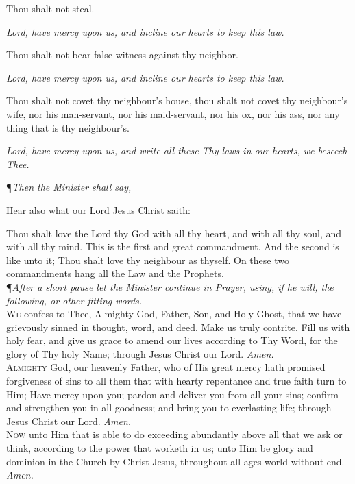 Thou shalt not steal.

\textit{Lord, have mercy upon us, and incline our hearts to keep this law.}

Thou shalt not bear false witness against thy neighbor.

\textit{Lord, have mercy upon us, and incline our hearts to keep this law.}

Thou shalt not covet thy neighbour's house, thou shalt not covet thy neighbour's wife, nor his man-servant, nor his maid-servant, nor his ox, nor his ass, nor any thing that is thy neighbour's.

\textit{Lord, have mercy upon us, and write all these Thy laws in our hearts, we beseech Thee.} \\

{\centering \P\textit{Then the Minister shall say,} \par}
\vspace{2ex}

Hear also what our Lord Jesus Christ saith: \par
Thou shalt love the Lord thy God with all thy heart, and with all thy soul, and with all thy mind.
This is the first and great commandment.
And the second is like unto it; Thou shalt love thy neighbour as thyself.
On these two commandments hang all the Law and the Prophets. \\

\noindent\P\textit{After a short pause let the Minister continue in Prayer, using, if he will, the following, or other fitting words.} \\

\noindent\lettrine{W}{e} confess to Thee, Almighty God, Father, Son, and Holy Ghost, that we have grievously sinned in thought, word, and deed.
Make us truly contrite.
Fill us with holy fear, and give us grace to amend our lives according to Thy Word, for the glory of Thy holy Name; through Jesus Christ our Lord.
\textit{Amen.} \\

\noindent\lettrine{A}{lmighty} God, our heavenly Father, who of His great mercy hath promised forgiveness of sins to all them that with hearty repentance and true faith turn to Him; Have mercy upon you; pardon and deliver you from all your sins; confirm and strengthen you in all goodness; and bring you to everlasting life; through Jesus Christ our Lord. 
\textit{Amen.} \\

\noindent\lettrine{N}{ow} unto Him that is able to do exceeding abundantly above all that we ask or think, according to the power that worketh in us; unto Him be glory and dominion in the Church by Christ Jesus, throughout all ages world without end.
\textit{Amen.}
